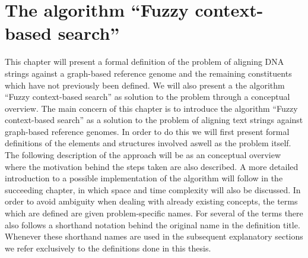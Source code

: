 \documentclass[thesis.tex]{subfiles}
\begin{document}
\chapter{The algorithm ``Fuzzy context-based search''}
{\parindent0pt
This chapter will present a formal definition of the problem of aligning DNA strings against a graph-based reference genome and the remaining constituents which have not previously been defined. We will also present a the algorithm ``Fuzzy context-based search'' as solution to the problem through a conceptual overview.
The main concern of this chapter is to introduce the algorithm ``Fuzzy context-based search'' as a solution to the problem of aligning text strings against graph-based reference genomes. In order to do this we will first present formal definitions of the elements and structures involved aswell as the problem itself. The following description of the approach will be as an conceptual overview where the motivation behind the steps taken are also described. A more detailed introduction to a possible implementation of the algorithm will follow in the succeeding chapter, in which space and time complexity will also be discussed. In order to avoid ambiguity when dealing with already existing concepts, the terms which are defined are given problem-specific names. For several of the terms there also follows a shorthand notation behind the original name in the definition title. Whenever these shorthand names are used in the subsequent explanatory sections we refer exclusively to the definitions done in this thesis.
}
\end{document}
